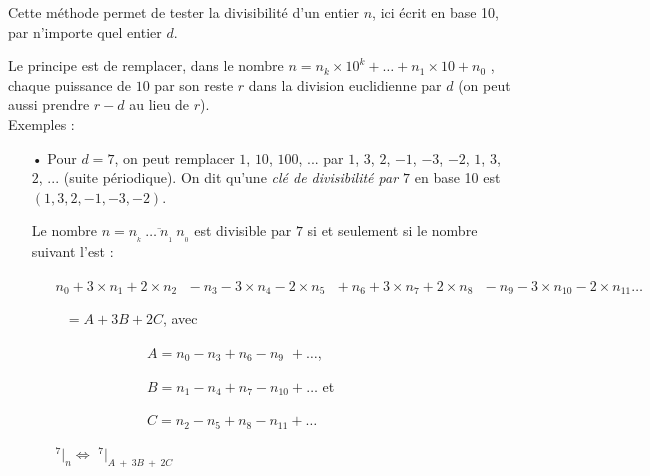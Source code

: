 \documentclass[a4paper, twoside]{article}
\begin{document}
	Cette méthode permet de tester la divisibilité d'un entier $n$, ici écrit en base 10, par n'importe quel entier $d$.

	Le principe est de remplacer, dans le nombre $n = n_k\times10^k + \dots + n_1\times10 + n_0$ , chaque puissance de $10$ par son reste $r$ dans la division euclidienne par $d$ (on peut aussi prendre $r - d$ au lieu de $r$).\\

	{ \parindent=0.5cm Exemples : }

	\begin{small}
	\begin{itemize}

		\item[•] Pour $d = 7$, on peut remplacer $1$, $10$, $100$, ... par $1$, $3$, $2$, $-1$, $-3$, $-2$, $1$, $3$, $2$, ... (suite périodique). On dit qu'une \textit{clé de divisibilité par $7$} en base 10 est $(1, 3, 2, -1, -3, -2)$.
		
		\vspace{0.2cm}
		
		Le nombre $n = \overline{n_{_{k}}~\dots~n_{_1}~n_{_0}}$ est divisible par $7$ si et seulement si le nombre suivant l'est :
		
		\vspace{0.2cm}
		
		\begin{itemize}
			\item[] $n_0 + 3 \times n_1 + 2 \times n_2 ~~~ - n_3 - 3 \times n_4 - 2 \times n_5 ~~~ + n_6 + 3 \times n_7 + 2 \times n_8 ~~~ - n_9 - 3 \times n_{10} - 2 \times n_{11}\dots$ 
			\item[] $~~~ = A + 3B + 2C$, avec 
			
			\begin{itemize}
				\item[] ~~~~~~~~~ $A = n_0 - n_3 + n_6 - n_{9\phantom{0}}    + \dots$, 
				\item[] ~~~~~~~~~ $B = n_1 - n_4 + n_7 - n_{10} + \dots$ 	et  	
				\item[] ~~~~~~~~~ $C = n_2 - n_5 + n_8 - n_{11} + \dots$
			\end{itemize}
			
			\vspace{0.2cm}		
			
			\item[] {\Large $ ^{7}|_n \Leftrightarrow$ $^{7}|_{A~+~3B~+~2C} $}\\
			
		\end{itemize}
		

\end{itemize}
\end{small}
\end{document}
